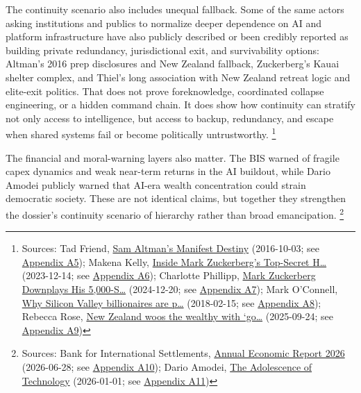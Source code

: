 \documentclass[
  american,
  11pt,
  letterpaper,
]{article}
\begin{document}
The continuity scenario also includes unequal fallback. Some of the same
actors asking institutions and publics to normalize deeper dependence on
AI and platform infrastructure have also publicly described or been
credibly reported as building private redundancy, jurisdictional exit,
and survivability options: Altman's 2016 prep disclosures and New
Zealand fallback, Zuckerberg's Kauai shelter complex, and Thiel's long
association with New Zealand retreat logic and elite-exit politics. That
does not prove foreknowledge, coordinated collapse engineering, or a
hidden command chain. It does show how continuity can stratify not only
access to intelligence, but access to backup, redundancy, and escape
when shared systems fail or become politically untrustworthy.
\footnote{Sources: Tad Friend,
  \href{https://www.newyorker.com/magazine/2016/10/10/sam-altmans-manifest-destiny}{Sam
  Altman's Manifest Destiny} (2016-10-03; see
  \hyperref[appendix-a5-sam-altman-s-manifest-destiny]{Appendix A5});
  Makena Kelly,
  \href{https://www.wired.com/story/mark-zuckerberg-inside-hawaii-compound}{Inside
  Mark Zuckerberg's Top-Secret H\ldots{}} (2023-12-14; see
  \hyperref[appendix-a6-inside-mark-zuckerbergs-top-secret-hawaii-compound]{Appendix
  A6}); Charlotte Phillipp,
  \href{https://people.com/mark-zuckerberg-hawaii-bunker-5000-square-feet-8765376}{Mark
  Zuckerberg Downplays His 5,000-S\ldots{}} (2024-12-20; see
  \hyperref[appendix-a7-mark-zuckerberg-downplays-his-5-000-square-foot-underground-bunker-in-hawaii-just-a-little-shelter]{Appendix
  A7}); Mark O'Connell,
  \href{https://www.theguardian.com/news/2018/feb/15/why-silicon-valley-billionaires-are-prepping-for-the-apocalypse-in-new-zealand}{Why
  Silicon Valley billionaires are p\ldots{}} (2018-02-15; see
  \hyperref[appendix-a8-why-silicon-valley-billionaires-are-prepping-for-the-apocalypse-in-new-zealand]{Appendix
  A8}); Rebecca Rose,
  \href{https://www.ft.com/content/76ca455c-3b16-4413-8738-3f17431d125b}{New
  Zealand woos the wealthy with `go\ldots{}} (2025-09-24; see
  \hyperref[appendix-a9-new-zealand-woos-the-wealthy-with-golden-visa-changes]{Appendix
  A9})}

The financial and moral-warning layers also matter. The BIS warned of
fragile capex dynamics and weak near-term returns in the AI buildout,
while Dario Amodei publicly warned that AI-era wealth concentration
could strain democratic society. These are not identical claims, but
together they strengthen the dossier's continuity scenario of hierarchy
rather than broad emancipation. \footnote{Sources: Bank for
  International Settlements,
  \href{https://www.bis.org/publ/arpdf/ar2026e.pdf}{Annual Economic
  Report 2026} (2026-06-28; see
  \hyperref[appendix-a10-annual-economic-report-2026]{Appendix A10});
  Dario Amodei,
  \href{https://darioamodei.com/essay/the-adolescence-of-technology}{The
  Adolescence of Technology} (2026-01-01; see
  \hyperref[appendix-a11-the-adolescence-of-technology]{Appendix A11})}
\end{document}

